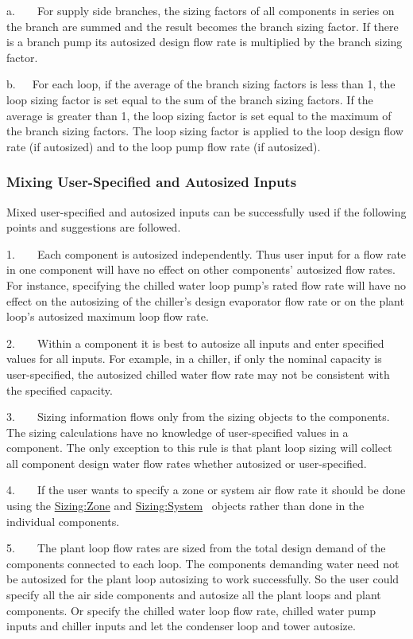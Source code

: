 a.~~~~For supply side branches, the sizing factors of all components in series on the branch are summed and the result becomes the branch sizing factor. If there is a branch pump its autosized design flow rate is multiplied by the branch sizing factor.

b.~~~For each loop, if the average of the branch sizing factors is less than 1, the loop sizing factor is set equal to the sum of the branch sizing factors. If the average is greater than 1, the loop sizing factor is set equal to the maximum of the branch sizing factors. The loop sizing factor is applied to the loop design flow rate (if autosized) and to the loop pump flow rate (if autosized).

\subsubsection{Mixing User-Specified and Autosized Inputs}\label{mixing-user-specified-and-autosized-inputs}

Mixed user-specified and autosized inputs can be successfully used if the following points and suggestions are followed.

1.~~~~Each component is autosized independently. Thus user input for a flow rate in one component will have no effect on other components' autosized flow rates. For instance, specifying the chilled water loop pump's rated flow rate will have no effect on the autosizing of the chiller's design evaporator flow rate or on the plant loop's autosized maximum loop flow rate.

2.~~~~Within a component it is best to autosize all inputs and enter specified values for all inputs. For example, in a chiller, if only the nominal capacity is user-specified, the autosized chilled water flow rate may not be consistent with the specified capacity.

3.~~~~Sizing information flows only from the sizing objects to the components. The sizing calculations have no knowledge of user-specified values in a component. The only exception to this rule is that plant loop sizing will collect all component design water flow rates whether autosized or user-specified.

4.~~~~If the user wants to specify a zone or system air flow rate it should be done using the \hyperref[sizingzone]{Sizing:Zone} and \hyperref[sizingsystem]{Sizing:System}~ objects rather than done in the individual components.

5.~~~~The plant loop flow rates are sized from the total design demand of the components connected to each loop. The components demanding water need not be autosized for the plant loop autosizing to work successfully. So the user could specify all the air side components and autosize all the plant loops and plant components. Or specify the chilled water loop flow rate, chilled water pump inputs and chiller inputs and let the condenser loop and tower autosize.

